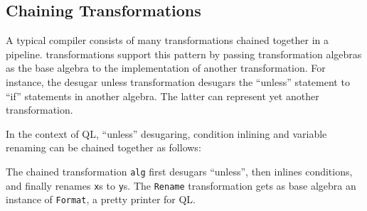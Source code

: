 


\subsection{Chaining Transformations}

A typical compiler consists of many transformations chained together in a pipeline.
\name transformations support this pattern by passing transformation algebras as the base algebra to the implementation of another transformation.
For instance, the desugar unless transformation desugars the ``unless'' statement to ``if'' statements in another algebra.
The latter can represent yet another transformation.

In the context of QL, ``unless'' desugaring, condition inlining and variable renaming can be chained together as follows:


The chained transformation \lstinline{alg} first desugars ``unless'', then inlines conditions, and finally renames \lstinline{x}s to \lstinline{y}s.
The \lstinline{Rename} transformation gets as base algebra an instance of \lstinline{Format}, a pretty printer for QL.


